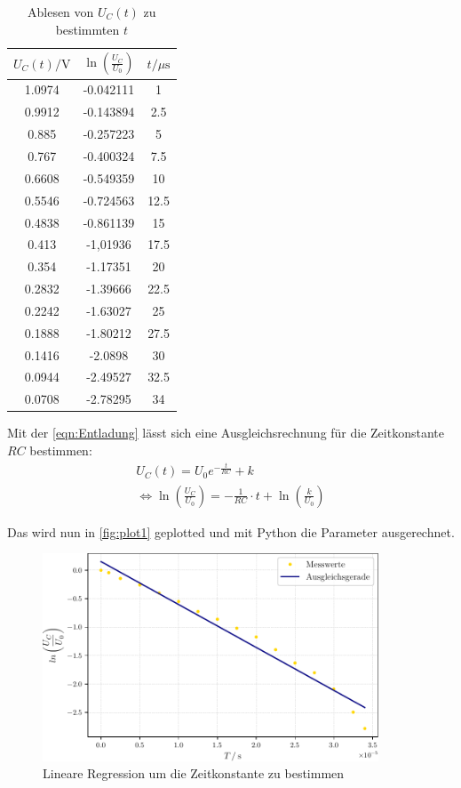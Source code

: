 \begin{table}
  \centering
  \caption{Ablesen von $U_{C}(t)$ zu bestimmten $t$}
  \label{tab:Uc,ln,T}
  \begin{tabular}{c c c}
    \toprule
    $U_C(t)/\unit{\volt}$ & $\ln{\left(\frac{U_C}{U_0}\right)}$ & $t/\mu \unit{\second}$ \\
    \midrule
    1.0974   &   -0.042111   &   1   \\
    0.9912   &   -0.143894   &   2.5  \\
    0.885    &   -0.257223   &   5   \\
    0.767    &   -0.400324   &   7.5  \\
    0.6608   &   -0.549359   &   10    \\
    0.5546   &   -0.724563   &   12.5  \\
    0.4838   &   -0.861139   &   15   \\
    0.413    &   -1,01936    &   17.5  \\
    0.354    &   -1.17351    &   20    \\
    0.2832   &   -1.39666    &   22.5  \\
    0.2242   &   -1.63027    &   25   \\
    0.1888   &   -1.80212    &   27.5  \\
    0.1416   &   -2.0898     &   30    \\
    0.0944   &   -2.49527    &   32.5  \\
    0.0708   &   -2.78295    &   34   \\
    \bottomrule
  \end{tabular}
\end{table}

Mit der \autoref{eqn:Entladung} lässt sich eine Ausgleichsrechnung für die Zeitkonstante $RC$ bestimmen:
\begin{align*}
  U_C(t)=U_0e^{-\frac{t}{RC}} + k \\
  \Leftrightarrow \ln{\left(\frac{U_C}{U_0}\right)} = -\frac{1}{RC}\cdot t + \ln{\left(\frac{k}{U_0}\right)}
\end{align*}

Das wird nun in \autoref{fig:plot1} geplotted und mit Python die Parameter ausgerechnet.

\begin{figure}
  \centering
  \includegraphics[width=100mm,scale=0.5]{build/plot1.pdf}
  \caption{Lineare Regression um die Zeitkonstante zu bestimmen}
  \label{fig:plot1}
\end{figure}


